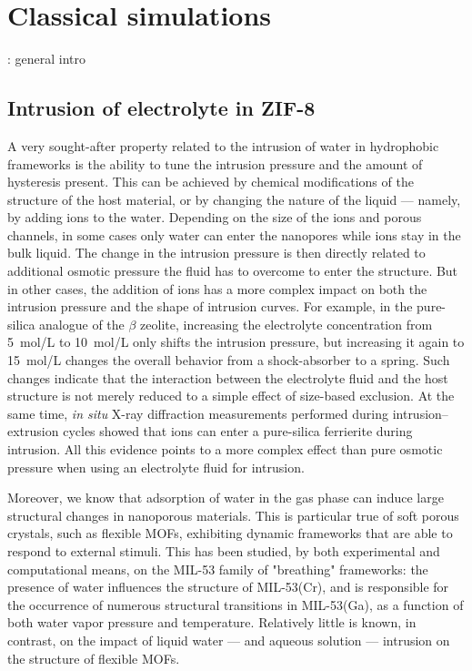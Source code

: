 \documentclass[thesis]{subfiles}
\begin{document}
\OnlyInSubfile{\setcounter{chapter}{4}}

\chapter{Classical simulations}
\startcontents[chapters]
\printpartialtoc

\TODO: general intro

\newpage
\section{Intrusion of electrolyte in ZIF-8}

A very sought-after property related to the intrusion of water in hydrophobic
frameworks is the ability to tune the intrusion pressure and the amount of
hysteresis present. This can be achieved by chemical modifications of the
structure of the host material\cite{AOrtiz2014}, or by changing the nature of
the liquid --- namely, by adding ions to the water\cite{Ortiz2014}. Depending on
the size of the ions and porous channels, in some cases only water can enter the
nanopores while ions stay in the bulk liquid. The change in the intrusion
pressure is then directly related to additional osmotic pressure the fluid has
to overcome to enter the structure\cite{MichelinJamois2015}. But in other cases,
the addition of ions has a more complex impact on both the intrusion pressure
and the shape of intrusion curves. For example, in the pure-silica analogue of
the $\beta$ zeolite\cite{Camblor1996}, increasing the electrolyte concentration
from \SI{5}{mol/L} to \SI{10}{mol/L} only shifts the intrusion pressure, but
increasing it again to \SI{15}{mol/L} changes the overall behavior from a
shock-absorber to a spring\cite{Ryzhikov2014}. Such changes indicate that the
interaction between the electrolyte fluid and the host structure is not merely
reduced to a simple effect of size-based exclusion. At the same time, \emph{in
situ} X-ray diffraction measurements performed during intrusion--extrusion
cycles showed that  ions can enter a pure-silica ferrierite during
intrusion\cite{Arletti2016}. All this evidence points to a more complex effect
than pure osmotic pressure when using an electrolyte fluid for intrusion.

Moreover, we know that adsorption of water in the gas phase can induce large
structural changes in nanoporous materials\cite{Lee2001, Seoung2013}. This is
particular true of soft porous crystals\cite{Horike2009}, such as
flexible MOFs\cite{Schneemann2014}, exhibiting dynamic frameworks that are
able to respond to external stimuli. This has been studied, by both experimental
and computational means, on the MIL-53 family of "breathing" frameworks: the
presence of water influences the structure of MIL-53(Cr)\cite{Haigis2013}, and
is responsible for the occurrence of numerous structural transitions in
MIL-53(Ga), as a function of both water vapor pressure and
temperature\cite{Boutin2013, Coudert2014}. Relatively little is known, in
contrast, on the impact of liquid water --- and aqueous solution --- intrusion
on the structure of flexible MOFs.
\end{document}
